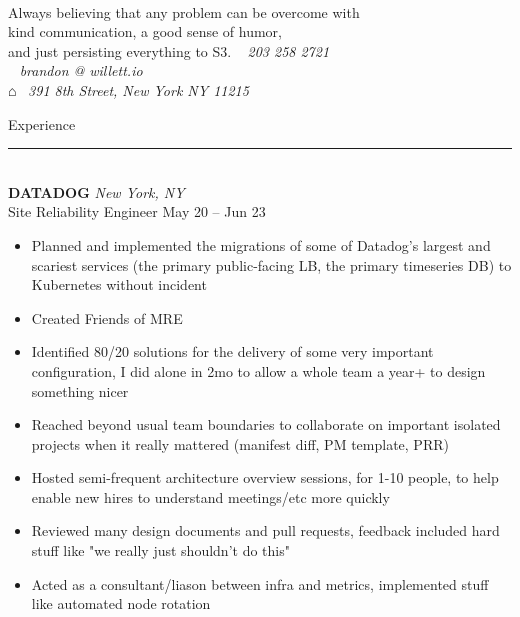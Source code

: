 \documentclass[letterpaper]{article}
\begin{document}
	\begin{bgbox}[height=\paperheight, colback=white, width=0.62\textwidth]\raggedright
		\vspace*{9pt}
		\begin{bgbox}[height=1.60in, colback=gray!15, width=\textwidth, top=0.05in]
			\\
			Always believing that any problem can be overcome with \\
			kind communication, a good sense of humor, \\
			and just persisting everything to S3. \hfill {\large\Telefon}~ \textit{203 258 2721} \\
			\null \hfill {\large\Letter}~ \textit{brandon @ willett.io } \\
			\null \hfill $\house$~ \textit{391 8th Street, New York NY 11215}
		\end{bgbox}\vspace*{25.5pt}
		{\Huge{Experience}}\\[-6pt]
		\noindent\rule{\textwidth}{1pt}\\[12pt]
		\textbf{DATADOG} \hfill \textit{New York, NY}\\
		Site Reliability Engineer \hfill May 20 -- Jun 23
		\begin{itemize} [noitemsep,topsep=4pt]
			\item Planned and implemented the migrations of some of Datadog's largest and scariest services (the primary public-facing LB, the primary timeseries DB) to Kubernetes without incident
			\item Created Friends of MRE
			\item Identified 80/20 solutions for the delivery of some very important configuration, I did alone in 2mo to allow a whole team a year+ to design something nicer
			\item Reached beyond usual team boundaries to collaborate on important isolated projects when it really mattered (manifest diff, PM template, PRR)
			\item Hosted semi-frequent architecture overview sessions, for 1-10 people, to help enable new hires to understand meetings/etc more quickly
			\item Reviewed many design documents and pull requests, feedback included hard stuff like "we really just shouldn't do this"
			\item Acted as a consultant/liason between infra and metrics, implemented stuff like automated node rotation

\end{itemize}
\end{bgbox}
\end{document}
